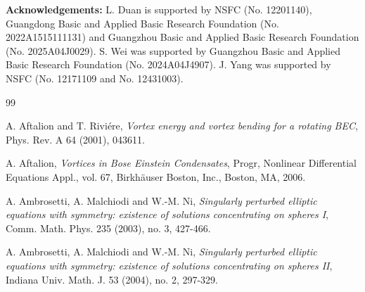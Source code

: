 \documentclass[10pt, reqno]{amsart}
\numberwithin{equation}{section}
\theoremstyle{definition}
\begin{document}
{\medskip
\medskip
{\bf Acknowledgements:}
L. Duan  is  supported by NSFC (No. 12201140), Guangdong Basic and Applied Basic Research Foundation (No. 2022A1515111131) and Guangzhou Basic and Applied Basic Research Foundation (No. 2025A04J0029).
S. Wei was supported by  Guangzhou Basic and Applied Basic Research Foundation (No. 2024A04J4907).
J. Yang was supported by NSFC (No. 12171109 and No. 12431003).
















































\begin{thebibliography}{99}

A. Aftalion and T. Rivi\'{e}re,
\emph{Vortex energy and vortex bending for a rotating BEC},
Phys. Rev. A
64 (2001), 043611.

A. Aftalion,
\emph{Vortices in Bose Einstein Condensates},
Progr, Nonlinear Differential Equations Appl., vol. 67, Birkh\"{a}user
Boston, Inc., Boston, MA, 2006.

A. Ambrosetti, A. Malchiodi and W.-M. Ni,
\emph{Singularly perturbed elliptic equations with symmetry: existence of solutions concentrating on spheres I},
Comm. Math. Phys.
235 (2003), no. 3, 427-466.




A. Ambrosetti, A. Malchiodi and W.-M. Ni,
\emph{Singularly perturbed elliptic equations with symmetry: existence of solutions concentrating on spheres II},
Indiana Univ. Math. J.
53 (2004), no. 2, 297-329.



\end{thebibliography}}
\end{document}
